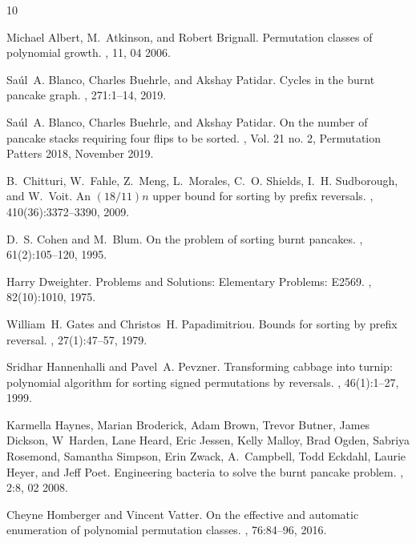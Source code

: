 \documentclass{article}
\numberwithin{equation}{section}
\theoremstyle{definition}
\begin{document}

\begin{thebibliography}{10}

Michael Albert, M.~Atkinson, and Robert Brignall.
\newblock Permutation classes of polynomial growth.
, 11, 04 2006.

Sa\'{u}l~A. Blanco, Charles Buehrle, and Akshay Patidar.
\newblock Cycles in the burnt pancake graph.
, 271:1--14, 2019.

Sa\'ul~A. Blanco, Charles Buehrle, and Akshay Patidar.
\newblock On the number of pancake stacks requiring four flips to be sorted.
, {Vol.
  21 no. 2, Permutation Patters 2018}, November 2019.

B.~Chitturi, W.~Fahle, Z.~Meng, L.~Morales, C.~O. Shields, I.~H. Sudborough,
  and W.~Voit.
\newblock An {$(18/11)n$} upper bound for sorting by prefix reversals.
, 410(36):3372--3390, 2009.

D.~S. Cohen and M.~Blum.
\newblock On the problem of sorting burnt pancakes.
, 61(2):105--120, 1995.

Harry Dweighter.
\newblock Problems and {S}olutions: {E}lementary {P}roblems: {E}2569.
, 82(10):1010, 1975.

William~H. Gates and Christos~H. Papadimitriou.
\newblock Bounds for sorting by prefix reversal.
, 27(1):47--57, 1979.

Sridhar Hannenhalli and Pavel~A. Pevzner.
\newblock Transforming cabbage into turnip: polynomial algorithm for sorting
  signed permutations by reversals.
, 46(1):1--27, 1999.

Karmella Haynes, Marian Broderick, Adam Brown, Trevor Butner, James Dickson,
  W~Harden, Lane Heard, Eric Jessen, Kelly Malloy, Brad Ogden, Sabriya
  Rosemond, Samantha Simpson, Erin Zwack, A.~Campbell, Todd Eckdahl, Laurie
  Heyer, and Jeff Poet.
\newblock Engineering bacteria to solve the burnt pancake problem.
, 2:8, 02 2008.

Cheyne Homberger and Vincent Vatter.
\newblock On the effective and automatic enumeration of polynomial permutation
  classes.
, 76:84--96, 2016.


\end{thebibliography}
\end{document}
